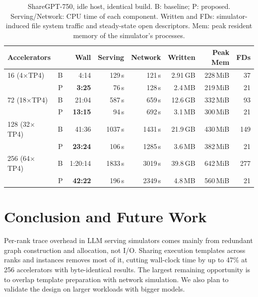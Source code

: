 \documentclass[conference]{IEEEtran}
\begin{document}
\begin{table}[t]
\caption{ShareGPT-750, idle host, identical build. B: baseline;
P: proposed. Serving/Network: CPU time of each component. Written and
FDs: simulator-induced file system traffic and steady-state open
descriptors. Mem: peak resident memory of the simulator's processes.}
\label{tab:results}
\centering
\footnotesize\setlength{\tabcolsep}{3.2pt}
\begin{tabular}{@{}lrrrrrrr@{}}
\toprule
Accelerators & & Wall & Serving & Network & Written & Peak Mem & FDs \\
\midrule
16 (4$\times$TP4)   & B & 4:14 & 129\,s & 121\,s & 2.91\,GB & 228\,MiB & 37 \\
                    & P & \textbf{3:25} & 76\,s & 128\,s & 2.4\,MB & 219\,MiB & 21 \\
72 (18$\times$TP4)  & B & 21:04 & 587\,s & 659\,s & 12.6\,GB & 332\,MiB & 93 \\
                    & P & \textbf{13:15} & 94\,s & 692\,s & 3.1\,MB & 300\,MiB & 21 \\
128 (32$\times$TP4) & B & 41:36 & 1037\,s & 1431\,s & 21.9\,GB & 430\,MiB & 149 \\
                    & P & \textbf{23:24} & 106\,s & 1285\,s & 3.6\,MB & 382\,MiB & 21 \\
256 (64$\times$TP4) & B & 1:20:14 & 1833\,s & 3019\,s & 39.8\,GB & 642\,MiB & 277 \\
                    & P & \textbf{42:22} & 196\,s & 2349\,s & 4.8\,MB & 560\,MiB & 21 \\
\bottomrule
\end{tabular}
\end{table}


\section{Conclusion and Future Work}

Per-rank trace overhead in LLM serving simulators comes mainly from redundant graph construction and allocation, not I/O. Sharing execution templates across ranks and instances removes most of it, cutting wall-clock time by up to 47\% at 256 accelerators with byte-identical results. The largest remaining opportunity is to overlap template preparation with network simulation. We also plan to  validate the design on larger workloads with bigger models.
\end{document}
